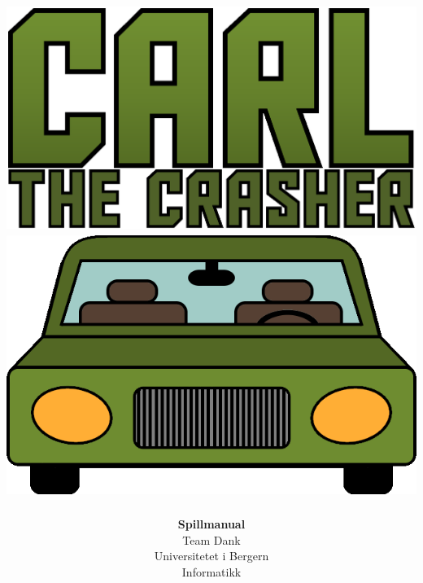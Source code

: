 \documentclass[paper=a4]{article}
\begin{document}
\title{ \normalsize \includegraphics[scale=0.43]{images/CarGameLogo.png}
	\\
	\includegraphics[scale=0.5]{images/menu_car.png}
}
\author{\textbf{Spillmanual} \\
Team Dank \\
Universitetet i Bergern \\
Informatikk}
\maketitle
\newpage
\end{document}
